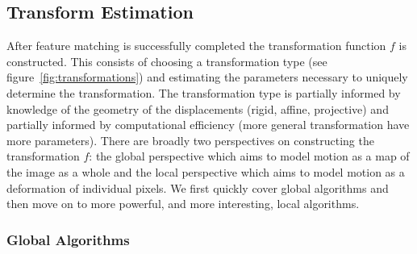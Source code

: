 \subsection{Transform Estimation}

After feature matching is successfully completed the transformation function \(f\) is constructed.
%
This consists of choosing a transformation type (see figure~\ref{fig:transformations}) and estimating the parameters necessary to uniquely determine the transformation.
%
The transformation type is partially informed by knowledge of the geometry of the displacements (rigid, affine, projective) and partially informed by computational efficiency (more general transformation have more parameters).
%
There are broadly two perspectives on constructing the transformation \(f\): the global perspective which aims to model motion as a map of the image as a whole and the local perspective which aims to model motion as a deformation of individual pixels.
%
%
We first quickly cover global algorithms and then move on to more powerful, and more interesting, local algorithms.

\subsubsection{Global Algorithms}

